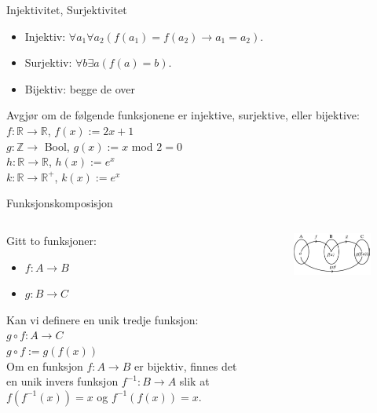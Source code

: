 \begin{frame}{Injektivitet, Surjektivitet}
    \begin{itemize}
        \item Injektiv:  $\forall a_1 \forall a_2 (f(a_1) = f(a_2) \rightarrow a_1 = a_2)$.\\
        \item Surjektiv: $\forall b \exists a (f(a) = b)$.\\
        \item Bijektiv: begge de over \\
    \end{itemize}
    
    \begin{block}{Avgjør om de følgende funksjonene er injektive, surjektive, eller bijektive:}
        $f : \mathbb{R} \rightarrow \mathbb{R}$, $f(x) := 2x + 1$\\
        $g : \mathbb{Z} \rightarrow $ Bool, $g(x) := x$ mod $2 = 0$\\
        $h : \mathbb{R} \rightarrow \mathbb{R}$, $h(x) := e^x$\\
        $k : \mathbb{R} \rightarrow \mathbb{R^+}$, $k(x) := e^x$\\
    \end{block}
\end{frame}

\begin{frame}{Funksjonskomposisjon}
    \begin{columns}
    \begin{column}{0.5\textwidth}
Gitt to funksjoner:
    \begin{itemize}
        \item $f : A \rightarrow B$
        \item $g : B \rightarrow C$
    \end{itemize}
Kan vi definere en unik tredje funksjon: \\
    $g \circ f : A \rightarrow C$\\
    $g \circ f := g(f(x))$\\
Om en funksjon $f : A \rightarrow B$ er bijektiv, finnes det en unik invers funksjon $f^{-1} : B \rightarrow A$ slik at $f(f^{-1}(x)) = x$ og $f^{-1}(f(x)) = x$.
    \end{column}
    \begin{column}{0.33\textwidth}
    \begin{figure}
       \includegraphics[scale = 0.4]{gof.jpeg} 
    \end{figure}
        
    \end{column}
    \end{columns}
\end{frame}

